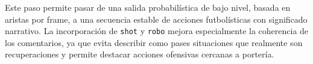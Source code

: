 Este paso permite pasar de una salida probabilística de bajo nivel, basada en aristas por frame, a una secuencia estable de acciones futbolísticas con significado narrativo. La incorporación de \texttt{shot} y \texttt{robo} mejora especialmente la coherencia de los comentarios, ya que evita describir como pases situaciones que realmente son recuperaciones y permite destacar acciones ofensivas cercanas a portería.